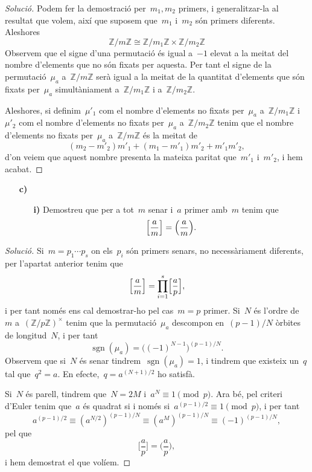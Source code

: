 \documentclass[a4paper]{article}
\newcommand{\ZZ}{\mathbb{Z}}
\DeclareMathOperator{\sgn}{sgn}
\newenvironment{solution}{
    \renewcommand\qedsymbol{\ensuremath{\lozenge}}
    \begin{proof}[Solució]
        }{
    \end{proof}
}
\begin{document}
\begin{solution}
    Podem fer la demostració per~\(m_{1},m_{2}\) primers, i generalitzar-la al
    resultat que volem, així que suposem que~\(m_{1}\) i~\(m_{2}\) són primers
    diferents. Aleshores
    \[
        \ZZ/m\ZZ
        \cong
        \ZZ/m_{1}\ZZ\times\ZZ/m_{2}\ZZ
    \]
    Observem que el signe d'una permutació és igual a~\(-1\) elevat a la meitat
    del nombre d'elements que no són fixats per aquesta. Per tant el signe de la
    permutació~\(\mu_{a}\) a~\(\ZZ/m\ZZ\) serà igual a la meitat de la quantitat
    d'elements que són fixats per~\(\mu_{a}\) simultàniament a~\(\ZZ/m_{1}\ZZ\)
    i a~\(\ZZ/m_{2}\ZZ\).

    Aleshores, si definim~\(\mu'_{1}\) com el nombre d'elements no fixats
    per~\(\mu_{a}\) a~\(\ZZ/m_{1}\ZZ\) i~\(\mu'_{2}\) com el nombre d'elements
    no fixats per~\(\mu_{a}\) a~\(\ZZ/m_{2}\ZZ\) tenim que el nombre d'elements
    no fixats per~\(\mu_{a}\) a~\(\ZZ/m\ZZ\) és la meitat de
    \[
        (m_{2}-m'_{2})m'_{1} + (m_{1}-m'_{1})m'_{2} + m'_{1}m'_{2},
    \]
    d'on veiem que aquest nombre presenta la mateixa paritat que~\(m'_{1}\)
    i~\(m'_{2}\), i hem acabat.
\end{solution}

\begin{enumerate}
    \item[\textbf{c)}]
        \begin{enumerate}
            \item[\textbf{i)}]
                Demostreu que per a tot~\(m\) senar i~\(a\) primer
                amb~\(m\) tenim que
                \[
                    \Bigl[\frac{a}{m}\Bigr]
                    =
                    \Bigl(\frac{a}{m}\Bigr).
                \]
        \end{enumerate}
\end{enumerate}

\begin{solution}
    Si~\(m=p_{1}\cdots p_{s}\) on els~\(p_{i}\) són primers senars, no
    necessàriament diferents, per l'apartat anterior tenim que
    \[
        \Bigl[\frac{a}{m}\Bigr]
        =
        \prod_{i=1}^{s}\Bigl[\frac{a}{p}\Bigr],
    \]
    i per tant només ens cal demostrar-ho pel cas~\(m=p\) primer.
    Si~\(N\) és l'ordre de~\(m\) a~\((\ZZ/p\ZZ)^{\times}\) tenim que la
    permutació~\(\mu_{a}\) descompon en~\((p-1)/N\) òrbites de longitud~\(N\), i
    per tant
    \[
        \sgn(\mu_{a}) = \bigl((-1)^{N-1}\bigr)^{(p-1)/N}.
    \]
    Observem que si~\(N\) és senar tindrem~\(\sgn(\mu_{a})=1\), i tindrem que
    existeix un~\(q\) tal que~\(q^{2}=a\). En efecte,~\(q=a^{(N+1)/2}\) ho
    satisfà.

    Si~\(N\) és parell, tindrem que~\(N=2M\) i~\(a^{N}\equiv1\pmod{p}\).
    Ara bé, pel criteri d'Euler tenim que~\(a\) és quadrat si i només
    si~\(a^{(p-1)/2}\equiv1\pmod{p}\), i per tant
    \[
        a^{(p-1)/2}
        \equiv
        (a^{N/2})^{(p-1)/N}
        \equiv
        (a^{M})^{(p-1)/N}
        \equiv
        (-1)^{(p-1)/N},
    \]
    pel que
    \[
        \biggl[\frac{a}{p}\biggr]
        =
        \biggl(\frac{a}{p}\biggr),
    \]
    i hem demostrat el que volíem.
\end{solution}
\end{document}
